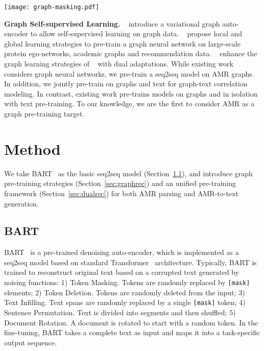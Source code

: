 \documentclass[11pt]{article}
\begin{document}
\begin{figure*}[!t]
	\centering
	\texttt{[image: graph-masking.pdf]}
	\caption{Illustration of two graph pre-training strategies: 1) node/edge level denoising (a b); 2) sub-graph level denoising (c b). Two transformations can be composed.}
	\label{fig:graph-masking}
\end{figure*}

\noindent\textbf{Graph Self-supervised Learning.}
~\citet{Kipf2016VariationalGA} introduce a variational graph auto-encoder to allow self-supervised learning on graph data.
~\citet{Hu2020StrategiesFP,Hu2020GPTGNNGP} propose local and global learning strategies to pre-train a graph neural network on large-scale protein ego-networks, academic graphs and recommendation data. 
~\citet{Lu2021LearningTP} enhance the graph learning strategies of ~\citet{Hu2020GPTGNNGP} with dual adaptations.
While existing work considers graph neural networks, we pre-train a seq2seq model on AMR graphs. 
In addition, we jointly pre-train on graphs and text for graph-text correlation modeling.
In contrast, existing work pre-trains models on graphs and in isolation with text pre-training.
To our knowledge, we are the first to consider AMR as a graph pre-training target.

\section{Method}
We take BART~\cite{lewis-etal-2020-bart} as the basic seq2seq model (Section~\ref{sec:bart}), and introduce graph pre-training strategies (Section~\ref{sec:graphrec}) and an unified pre-training framework (Section~\ref{sec:dualrec}) for both AMR parsing and AMR-to-text generation.
\subsection{BART}
\label{sec:bart}
BART~\cite{lewis-etal-2020-bart} is a pre-trained denoising auto-encoder, which is implemented as a seq2seq model based on standard Transformer~\cite{vaswani2017attention} architecture.
Typically, BART is trained to reconstruct original text based on a corrupted text generated by  noising functions: 1) Token Masking. Tokens are randomly replaced by \texttt{[mask]} elements;
2) Token Deletion. Tokens are randomly deleted from the input;
3) Text Infilling. Text spans are randomly replaced by a single \texttt{[mask]} token;
4) Sentence Permutation. Text is divided into segments and then shuffled;
5) Document Rotation. A document is rotated to start with a random token.
In the fine-tuning, BART takes a complete text as input and maps it into a task-specific output sequence.
\end{document}
